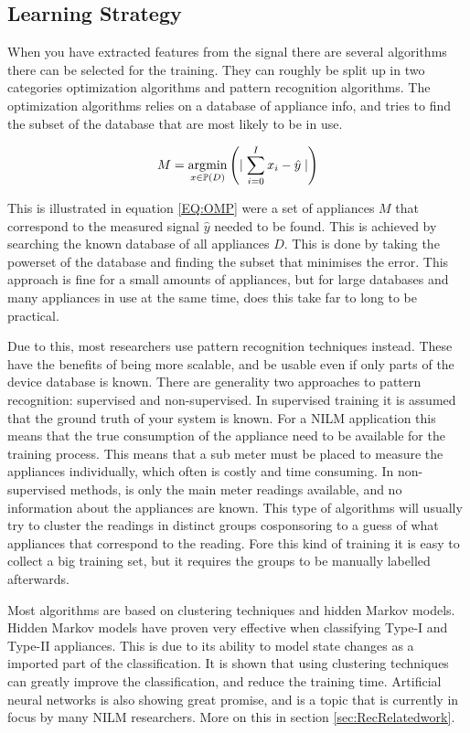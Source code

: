 \subsection{Learning Strategy} 
When you have extracted features from the signal there are several algorithms there can be selected for the training. They can roughly be split up in two categories optimization algorithms and pattern recognition algorithms. The optimization algorithms relies on a database of appliance info, and tries to find the subset of the database that are most likely to be in use. 

\begin{equation}
	M = \operatorname*{\arg\!\min}_{x \in \mathbb{P}(D) } \left( \mid {\sum_{i = 0}^{I} x_i - \hat{y}  \mid} \right)
	\label{EQ:OMP}
\end{equation}

This is illustrated in equation \ref{EQ:OMP} were a set of appliances $M$ that correspond to the measured signal $\hat{y}$ needed to be found. This is achieved by searching the known database of all appliances $D$. This is done by taking the powerset of the database and finding the subset that minimises the error. This approach is fine for a small amounts of appliances, but for large databases and many appliances in use at the same time, does this take far to long to be practical. 

Due to this, most researchers use pattern recognition techniques instead. These have the benefits of being more scalable, and be usable even if only parts of the device database is known. There are generality two approaches to pattern recognition: supervised and non-supervised. In supervised training it is assumed that the ground truth of your system is known. For a NILM application this means that the true consumption of the appliance need to be available for the training process. This means that a sub meter must be placed to measure the appliances individually, which often is costly and time consuming. In non-supervised methods, is only the main meter readings available, and no information about the appliances are known. This type of algorithms will usually try to cluster the readings in distinct groups cosponsoring to a guess of what appliances that correspond to the reading. Fore this kind of training it is easy to collect a big training set, but it requires the groups to be manually labelled afterwards.  
  
Most algorithms are based on clustering techniques and hidden Markov models. Hidden Markov models have proven very effective when classifying Type-I and Type-II appliances. This is due to its ability to model state changes as a imported part of the classification. It is shown that using clustering techniques can greatly improve the classification, and reduce the training time. Artificial neural networks is also showing great promise, and is a topic that is currently in focus by many NILM researchers. More on this in section \ref{sec:RecRelatedwork}. 

